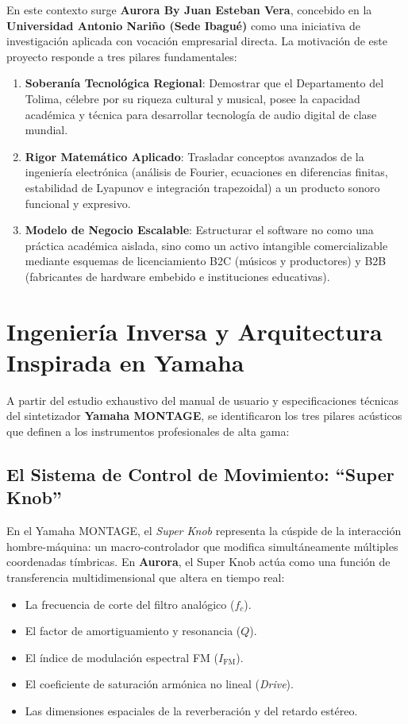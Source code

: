 \documentclass[11pt,a4paper]{article}
\begin{document}
En este contexto surge \textbf{Aurora By Juan Esteban Vera}, concebido en la \textbf{Universidad Antonio Nariño (Sede Ibagué)} como una iniciativa de investigación aplicada con vocación empresarial directa. La motivación de este proyecto responde a tres pilares fundamentales:

\begin{enumerate}
    \item \textbf{Soberanía Tecnológica Regional}: Demostrar que el Departamento del Tolima, célebre por su riqueza cultural y musical, posee la capacidad académica y técnica para desarrollar tecnología de audio digital de clase mundial.
    \item \textbf{Rigor Matemático Aplicado}: Trasladar conceptos avanzados de la ingeniería electrónica (análisis de Fourier, ecuaciones en diferencias finitas, estabilidad de Lyapunov e integración trapezoidal) a un producto sonoro funcional y expresivo.
    \item \textbf{Modelo de Negocio Escalable}: Estructurar el software no como una práctica académica aislada, sino como un activo intangible comercializable mediante esquemas de licenciamiento B2C (músicos y productores) y B2B (fabricantes de hardware embebido e instituciones educativas).
\end{enumerate}

\section{Ingeniería Inversa y Arquitectura Inspirada en Yamaha}

A partir del estudio exhaustivo del manual de usuario y especificaciones técnicas del sintetizador \textbf{Yamaha MONTAGE}, se identificaron los tres pilares acústicos que definen a los instrumentos profesionales de alta gama:

\subsection{El Sistema de Control de Movimiento: ``Super Knob''}
En el Yamaha MONTAGE, el \textit{Super Knob} representa la cúspide de la interacción hombre-máquina: un macro-controlador que modifica simultáneamente múltiples coordenadas tímbricas. En \textbf{Aurora}, el Super Knob actúa como una función de transferencia multidimensional que altera en tiempo real:
\begin{itemize}
    \item La frecuencia de corte del filtro analógico ($f_c$).
    \item El factor de amortiguamiento y resonancia ($Q$).
    \item El índice de modulación espectral FM ($I_{\text{FM}}$).
    \item El coeficiente de saturación armónica no lineal (\textit{Drive}).
    \item Las dimensiones espaciales de la reverberación y del retardo estéreo.
\end{itemize}
\end{document}
